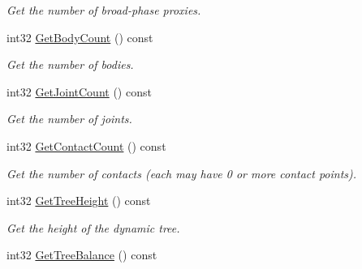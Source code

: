 \begin{DoxyCompactItemize}
\begin{DoxyCompactList}\small\item\em Get the number of broad-\/phase proxies. \end{DoxyCompactList}\item 
\hypertarget{classb2_world_a4559122ea51401b4fb7342eb6232ce74}{int32 \hyperlink{classb2_world_a4559122ea51401b4fb7342eb6232ce74}{Get\-Body\-Count} () const }\label{classb2_world_a4559122ea51401b4fb7342eb6232ce74}

\begin{DoxyCompactList}\small\item\em Get the number of bodies. \end{DoxyCompactList}\item 
\hypertarget{classb2_world_a54a95a98787ed5f383c6549ee1f4c4d5}{int32 \hyperlink{classb2_world_a54a95a98787ed5f383c6549ee1f4c4d5}{Get\-Joint\-Count} () const }\label{classb2_world_a54a95a98787ed5f383c6549ee1f4c4d5}

\begin{DoxyCompactList}\small\item\em Get the number of joints. \end{DoxyCompactList}\item 
\hypertarget{classb2_world_abcc976f1755f9bb94a8650f5f4219a8d}{int32 \hyperlink{classb2_world_abcc976f1755f9bb94a8650f5f4219a8d}{Get\-Contact\-Count} () const }\label{classb2_world_abcc976f1755f9bb94a8650f5f4219a8d}

\begin{DoxyCompactList}\small\item\em Get the number of contacts (each may have 0 or more contact points). \end{DoxyCompactList}\item 
\hypertarget{classb2_world_a48f90a31dc2ad30dbc50cac5111400d7}{int32 \hyperlink{classb2_world_a48f90a31dc2ad30dbc50cac5111400d7}{Get\-Tree\-Height} () const }\label{classb2_world_a48f90a31dc2ad30dbc50cac5111400d7}

\begin{DoxyCompactList}\small\item\em Get the height of the dynamic tree. \end{DoxyCompactList}\item 
\hypertarget{classb2_world_a9fb7c28d042b600ba1155e3d38f1c5f9}{int32 \hyperlink{classb2_world_a9fb7c28d042b600ba1155e3d38f1c5f9}{Get\-Tree\-Balance} () const }\label{classb2_world_a9fb7c28d042b600ba1155e3d38f1c5f9}


\end{DoxyCompactItemize}
